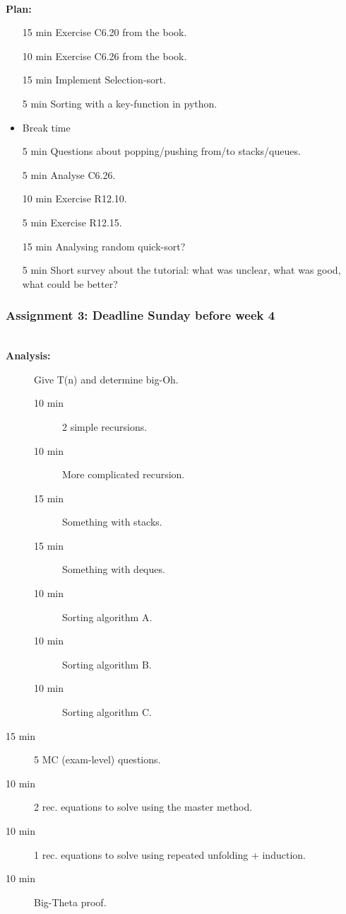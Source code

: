 \hfill\\
\textbf{Plan:}\\
\begin{itemize}
	\item[15 min] Exercise C6.20 from the book.
	\item[10 min] Exercise C6.26 from the book.
	\item[15 min] Implement Selection-sort.
	\item[5 min] Sorting with a key-function in python.
	\item Break time
	\item[5 min] Questions about popping/pushing from/to stacks/queues.
	\item[5 min] Analyse C6.26.
	\item[10 min] Exercise R12.10.
	\item[5 min] Exercise R12.15.
	\item[15 min] Analysing random quick-sort? 
	\item[5 min] Short survey about the tutorial: what was unclear, what was good, what could be better?
\end{itemize}


\newpage
\subsubsection{Assignment 3: Deadline Sunday before week 4}
\label{ssub:assignment_3}

\hfill\\
\textbf{Analysis:}\\
\begin{description}
	\item[] Give T(n) and determine big-Oh. 
		\begin{description}
			\item[10 min] 2 simple recursions.
			\item[10 min] More complicated recursion.
			\item[15 min] Something with stacks.
			\item[15 min] Something with deques.
			\item[10 min] Sorting algorithm A.
			\item[10 min] Sorting algorithm B.
			\item[10 min] Sorting algorithm C.
		\end{description}
	\item[15 min] 5 MC (exam-level) questions.
	\item[10 min] 2 rec. equations to solve using the master method.
	\item[10 min] 1 rec. equations to solve using repeated unfolding + induction.
	\item[10 min] Big-Theta proof.
\end{description}

